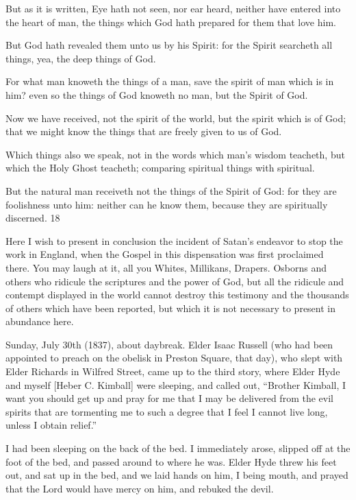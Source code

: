But as it is written, Eye hath not seen, nor ear heard, neither have entered into the heart of
man, the things which God hath prepared for them that love him.

But God hath revealed them unto us by his Spirit: for the Spirit searcheth all things, yea, the
deep things of God.

For what man knoweth the things of a man, save the spirit of man which is in him? even so
the things of God knoweth no man, but the Spirit of God.

Now we have received, not the spirit of the world, but the spirit which is of God; that we
might know the things that are freely given to us of God.

Which things also we speak, not in the words which man's wisdom teacheth, but which the
Holy Ghost teacheth; comparing spiritual things with spiritual.

But the natural man receiveth not the things of the Spirit of God: for they are foolishness
unto him: neither can he know them, because they are spiritually discerned. 18

Here I wish to present in conclusion the incident of Satan's endeavor to stop the work in
England, when the Gospel in this dispensation was first proclaimed there. You may laugh at
it, all you Whites, Millikans, Drapers. Osborns and others who ridicule the scriptures and the
power of God, but all the ridicule and contempt displayed in the world cannot destroy this
testimony and the thousands of others which have been reported, but which it is not
necessary to present in abundance here.

Sunday, July 30th (1837), about daybreak. Elder Isaac Russell (who had been appointed to
preach on the obelisk in Preston Square, that day), who slept with Elder Richards in Wilfred
Street, came up to the third story, where Elder Hyde and myself [Heber C. Kimball] were
sleeping, and called out, ``Brother Kimball, I want you should get up and pray for me that I
may be delivered from the evil spirits that are tormenting me to such a degree that I feel I
cannot live long, unless I obtain relief.''

I had been sleeping on the back of the bed. I immediately arose, slipped off at the foot of the
bed, and passed around to where he was. Elder Hyde threw his feet out, and sat up in the bed,
and we laid hands on him, I being mouth, and prayed that the Lord would have mercy on
him, and rebuked the devil.

